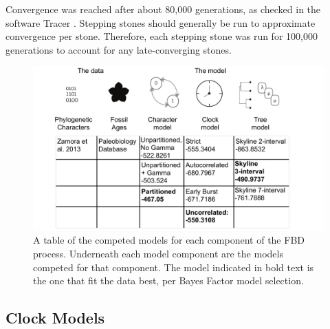 \documentclass{article}
\begin{document}
Convergence was reached after about 80,000 generations, as checked in the software Tracer \citep{Rambaut2018}. 
Stepping stones should generally be run to approximate convergence per stone.
Therefore, each stepping stone was run for 100,000 generations to account for any late-converging stones.

\begin{figure}
  \includegraphics[width=\textwidth]{figures/Fig1.pdf}

  \caption{A table of the competed models for each component of the FBD process. Underneath each model component are the models competed for that component. The model indicated in bold text is the one that fit the data best, per Bayes Factor model selection.}
\end{figure}


\subsection{Clock Models}
\end{document}
